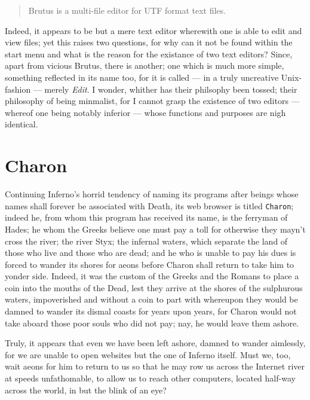 \documentclass[a4paper,12pt]{report}
\begin{document}
    \begin{quote}
      Brutus is a multi-file editor for UTF format text files.
    \end{quote}

    Indeed, it appears to be but a mere text editor wherewith one is able to edit and view files; yet this raises two questions, for why can it not be found within the start menu and what is the reason for the existance of two text editors? Since, apart from vicious Brutus, there is another; one which is much more simple, something reflected in its name too, for it is called — in a truly uncreative Unix-fashion — merely \textit{Edit}. I wonder, whither has their philsophy been tossed; their philosophy of being minmalist, for I cannot grasp the existence of two editors — whereof one being notably inferior — whose functions and purposes are nigh identical.

      \section*{Charon}

      Continuing Inferno's horrid tendency of naming its programs after beings whose names shall forever be associated with Death, its web browser is titled \texttt{Charon}; indeed he, from whom this program has received its name, is the ferryman of Hades; he whom the Greeks believe one must pay a toll for otherwise they mayn't cross the river; the river Styx; the infernal waters, which separate the land of those who live and those who are dead; and he who is unable to pay his dues is forced to wander its shores for aeons before Charon shall return to take him to yonder side. Indeed, it was the custom of the Greeks and the Romans to place a coin into the mouths of the Dead, lest they arrive at the shores of the sulphurous waters, impoverished and without a coin to part with whereupon they would be damned to wander its dismal coasts for years upon years, for Charon would not take aboard those poor souls who did not pay; nay, he would leave them ashore.

      Truly, it appears that even we have been left ashore, damned to wander aimlessly, for we are unable to open websites but the one of Inferno itself. Must we, too, wait aeons for him to return to us so that he may row us across the Internet river at speeds unfathomable, to allow us to reach other computers, located half-way across the world, in but the blink of an eye?
\end{document}
